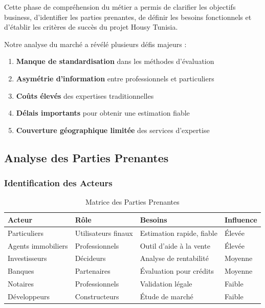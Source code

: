 \begin{resultbox}
Cette phase de compréhension du métier a permis de clarifier les objectifs business, d'identifier les parties prenantes, de définir les besoins fonctionnels et d'établir les critères de succès du projet Housy Tunisia.
\end{resultbox}

Notre analyse du marché a révélé plusieurs défis majeurs :

\begin{enumerate}
    \item \textbf{Manque de standardisation} dans les méthodes d'évaluation
    \item \textbf{Asymétrie d'information} entre professionnels et particuliers
    \item \textbf{Coûts élevés} des expertises traditionnelles
    \item \textbf{Délais importants} pour obtenir une estimation fiable
    \item \textbf{Couverture géographique limitée} des services d'expertise
\end{enumerate}

\subsection{Analyse des Parties Prenantes}
\label{subsec:parties_prenantes}

\subsubsection{Identification des Acteurs}

\begin{table}[H]
\centering
\caption{Matrice des Parties Prenantes}
\begin{tabular}{|l|l|l|l|}
\hline
\textbf{Acteur} & \textbf{Rôle} & \textbf{Besoins} & \textbf{Influence} \\
\hline
Particuliers & Utilisateurs finaux & Estimation rapide, fiable & Élevée \\
\hline
Agents immobiliers & Professionnels & Outil d'aide à la vente & Élevée \\
\hline
Investisseurs & Décideurs & Analyse de rentabilité & Moyenne \\
\hline
Banques & Partenaires & Évaluation pour crédits & Moyenne \\
\hline
Notaires & Professionnels & Validation légale & Faible \\
\hline
Développeurs & Constructeurs & Étude de marché & Faible \\
\hline
\end{tabular}
\label{tab:parties_prenantes}
\end{table}

